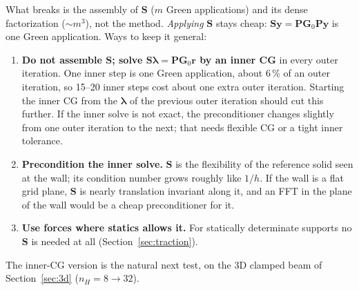 \documentclass[11pt,a4paper]{article}
\begin{document}
\noindent What breaks is the assembly of $\mathbf{S}$ ($m$ Green applications) and its dense factorization
($\sim m^3$), not the method. \emph{Applying} $\mathbf{S}$ stays cheap: $\mathbf{S}\mathbf{y} =
\mathbf{P}\mathbf{G}_0\mathbf{P}\mathbf{y}$ is one Green application. Ways to keep it general:
\begin{enumerate}
  \item \textbf{Do not assemble $\mathbf{S}$; solve $\mathbf{S}\boldsymbol{\lambda} = \mathbf{P}\mathbf{G}_0\mathbf{r}$ by an inner
        CG} in every outer iteration. One inner step is one Green application, about 6\,\% of an outer iteration, so
        15--20 inner steps cost about one extra outer iteration. Starting the inner CG from the $\boldsymbol{\lambda}$ of
        the previous outer iteration should cut this further. If the inner solve is not exact, the preconditioner
        changes slightly from one outer iteration to the next; that needs flexible CG or a tight inner tolerance.
  \item \textbf{Precondition the inner solve.} $\mathbf{S}$ is the flexibility of the reference solid seen at the wall;
        its condition number grows roughly like $1/h$. If the wall is a flat grid plane, $\mathbf{S}$ is nearly
        translation invariant along it, and an FFT in the plane of the wall would be a cheap preconditioner for it.
  \item \textbf{Use forces where statics allows it.} For statically determinate supports no $\mathbf{S}$ is needed at
        all (Section~\ref{sec:traction}).
\end{enumerate}
The inner-CG version is the natural next test, on the 3D clamped beam of Section~\ref{sec:3d} ($n_H = 8 \to 32$).

\end{document}
